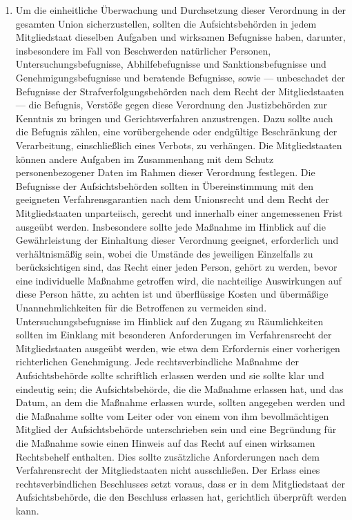 \begin{enumerate}

   \item Um die einheitliche Überwachung und Durchsetzung dieser Verordnung in der gesamten Union sicherzustellen,
    sollten die Aufsichtsbehörden in jedem Mitgliedstaat dieselben Aufgaben und wirksamen Befugnisse haben, darunter,
    insbesondere im Fall von Beschwerden natürlicher Personen, Untersuchungsbefugnisse, Abhilfebefugnisse und
    Sanktionsbefugnisse und Genehmigungsbefugnisse und beratende Befugnisse, sowie — unbeschadet der Befugnisse der
    Strafverfolgungsbehörden nach dem Recht der Mitgliedstaaten — die Befugnis, Verstöße gegen diese Verordnung den
    Justizbehörden zur Kenntnis zu bringen und Gerichtsverfahren anzustrengen. Dazu sollte auch die Befugnis zählen,
    eine vorübergehende oder endgültige Beschränkung der Verarbeitung, einschließlich eines Verbots, zu verhängen. Die
    Mitgliedstaaten können andere Aufgaben im Zusammenhang mit dem Schutz personenbezogener Daten im Rahmen dieser
    Verordnung festlegen. Die Befugnisse der Aufsichtsbehörden sollten in Übereinstimmung mit den geeigneten
    Verfahrensgarantien nach dem Unionsrecht und dem Recht der Mitgliedstaaten unparteiisch, gerecht und innerhalb
    einer angemessenen Frist ausgeübt werden. Insbesondere sollte jede Maßnahme im Hinblick auf die Gewährleistung der
    Einhaltung dieser Verordnung geeignet, erforderlich und verhältnismäßig sein, wobei die Umstände des jeweiligen
    Einzelfalls zu berücksichtigen sind, das Recht einer jeden Person, gehört zu werden, bevor eine individuelle
    Maßnahme getroffen wird, die nachteilige Auswirkungen auf diese Person hätte, zu achten ist und überflüssige Kosten
    und übermäßige Unannehmlichkeiten für die Betroffenen zu vermeiden sind. Untersuchungsbefugnisse im Hinblick auf
    den Zugang zu Räumlichkeiten sollten im Einklang mit besonderen Anforderungen im Verfahrensrecht der
    Mitgliedstaaten ausgeübt werden, wie etwa dem Erfordernis einer vorherigen richterlichen Genehmigung. Jede
    rechtsverbindliche Maßnahme der Aufsichtsbehörde sollte schriftlich erlassen werden und sie sollte klar und
    eindeutig sein; die Aufsichtsbehörde, die die Maßnahme erlassen hat, und das Datum, an dem die Maßnahme erlassen
    wurde, sollten angegeben werden und die Maßnahme sollte vom Leiter oder von einem von ihm bevollmächtigen Mitglied
    der Aufsichtsbehörde unterschrieben sein und eine Begründung für die Maßnahme sowie einen Hinweis auf das Recht auf
    einen wirksamen Rechtsbehelf enthalten. Dies sollte zusätzliche Anforderungen nach dem Verfahrensrecht der
    Mitgliedstaaten nicht ausschließen. Der Erlass eines rechtsverbindlichen Beschlusses setzt voraus, dass er in dem
    Mitgliedstaat der Aufsichtsbehörde, die den Beschluss erlassen hat, gerichtlich überprüft werden kann.%
   \label{eg:129}
   

\end{enumerate}
